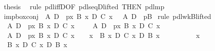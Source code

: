 \begin{isabellebody}
\ {\isacharquery}thesis\ \isamarkupfalse%
\ {\isacharparenleft}rule\ pdl{\isacharunderscore}iffD{}{\isacharbrackleft}OF\ pdl{\isacharunderscore}seqD{\isacharunderscore}lifted{}{\isacharcomma}\ THEN\ pdl{\isacharunderscore}mp{\isacharbrackright}{\isacharparenright}\isanewline
\isamarkupfalse%
\isanewline
\isanewline
\isanewline
\isamarkupfalse%
\ imp{\isacharunderscore}box{\isacharunderscore}conj{}{\isacharcolon}\ {\isachardoublequote}{\isasymturnstile}\ A\ {\isasymlongrightarrow}\isactrlsub D\ {\isacharbrackleft}{\isacharhash}\ p{\isacharbrackright}{\isacharparenleft}{\isasymlambda}x{\isachardot}\ B\ x\ {\isasymand}\isactrlsub D\ C\ x{\isacharparenright}\ {\isasymLongrightarrow}\ {\isasymturnstile}\ A\ {\isasymlongrightarrow}\isactrlsub D\ {\isacharbrackleft}{\isacharhash}\ p{\isacharbrackright}B{\isachardoublequote}\isanewline
\isamarkupfalse%
\ {\isacharparenleft}rule\ pdl{\isacharunderscore}wkB{\isacharunderscore}lifted{}{\isacharparenright}\isanewline
\ \ \isamarkupfalse%
\ {\isachardoublequote}{\isasymturnstile}\ A\ {\isasymlongrightarrow}\isactrlsub D\ {\isacharbrackleft}{\isacharhash}\ p{\isacharbrackright}{\isacharparenleft}{\isasymlambda}x{\isachardot}\ B\ x\ {\isasymand}\isactrlsub D\ C\ x{\isacharparenright}{\isachardoublequote}\isanewline
\ \ \isamarkupfalse%
\ {\isachardoublequote}{\isasymturnstile}\ A\ {\isasymlongrightarrow}\isactrlsub D\ {\isacharbrackleft}{\isacharhash}\ p{\isacharbrackright}{\isacharparenleft}{\isasymlambda}x{\isachardot}\ B\ x\ {\isasymand}\isactrlsub D\ C\ x{\isacharparenright}{\isachardoublequote}\ \isamarkupfalse%
\isacommand{{\isachardot}}\isanewline
\isamarkupfalse%
\isanewline
\ \ \isamarkupfalse%
\ {\isachardoublequote}{\isasymturnstile}\ A\ {\isasymlongrightarrow}\isactrlsub D\ {\isacharbrackleft}{\isacharhash}\ p{\isacharbrackright}{\isacharparenleft}{\isasymlambda}x{\isachardot}\ B\ x\ {\isasymand}\isactrlsub D\ C\ x{\isacharparenright}{\isachardoublequote}\isanewline
\ \ \isamarkupfalse%
\ {\isachardoublequote}{\isasymforall}x{\isachardot}\ {\isasymturnstile}\ B\ x\ {\isasymand}\isactrlsub D\ C\ x\ {\isasymlongrightarrow}\isactrlsub D\ B\ x{\isachardoublequote}\isanewline
\ \ \isamarkupfalse%
\ \isanewline
\ \ \ \ \isamarkupfalse%
\ x\ \isamarkupfalse%
\ {\isachardoublequote}{\isasymturnstile}\ B\ x\ {\isasymand}\isactrlsub D\ C\ x\ {\isasymlongrightarrow}\isactrlsub D\ B\ x{\isachardoublequote}\ \isamarkupfalse%

\end{isabellebody}
